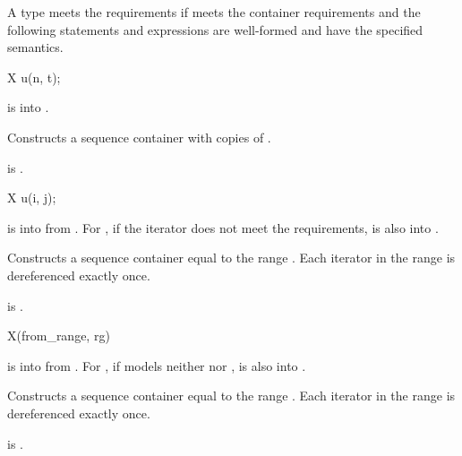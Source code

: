 \pnum
A type  meets the  requirements
if  meets the container requirements and
the following statements and expressions are well-formed and have
the specified semantics.

\begin{itemdecl}
X u(n, t);
\end{itemdecl}

\begin{itemdescr}
\pnum
\expects
{} is  into .

\pnum
\effects
Constructs a sequence container with  copies of .

\pnum
\ensures
{} is .
\end{itemdescr}

\begin{itemdecl}
X u(i, j);
\end{itemdecl}

\begin{itemdescr}
\pnum
\expects
{} is  into  from .
For ,
if the iterator does not meet
the  requirements,
 is also  into .

\pnum
\effects
Constructs a sequence container equal to the range \tcode{[i, j)}.
Each iterator in the range  is dereferenced exactly once.

\pnum
\ensures
{} is .
\end{itemdescr}

\begin{itemdecl}
X(from_range, rg)
\end{itemdecl}

\begin{itemdescr}
\pnum
\expects
{} is  into 
from .
For ,
if  models
neither  nor ,
 is also  into .

\pnum
\effects
Constructs a sequence container equal to the range .
Each iterator in the range  is dereferenced exactly once.

\pnum
\ensures
{} is .
\end{itemdescr}

